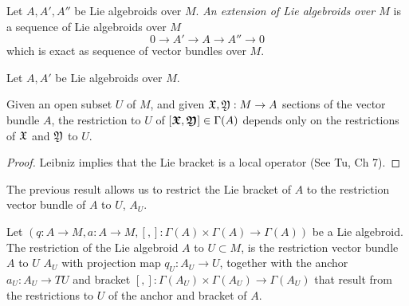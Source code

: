 \begin{definition} 
Let $A, A', A''$ be Lie algebroids over $M$. \emph{An extension of Lie algebroids over $M$} is a sequence of Lie algebroids over $M$ \[ 0 \to A' \to A \to A'' \to 0 \] which is exact as sequence of vector bundles over $M$.
\end{definition}

\linea

\begin{definition}
Let $A, A'$ be Lie algebroids over $M$. 
\end{definition}

\begin{proposition}
Given an open subset $U$ of $M$, and given $\mathfrak{X}, \mathfrak{Y} : M \to A$ sections of the vector bundle $A$, the restriction to $U$ of $[\bm{\mathfrak{X}}, \bm{\mathfrak{Y}}] \in \Gamma(A)$ depends only on the restrictions of $\mathfrak{X}$ and $\mathfrak{Y}$ to $U$.
\end{proposition}
\begin{proof}
Leibniz implies that the Lie bracket is a local operator (See Tu, Ch 7).
\end{proof}

The previous result allows us to restrict the Lie bracket of $A$ to the restriction vector bundle of $A$ to $U$, $A_U$.

\begin{definition}
Let $(q:A \to M, a: A \to M, [,]:\Gamma(A)\times \Gamma(A) \to \Gamma(A))$ be a Lie algebroid. The restriction of the Lie algebroid $A$ to $U \subset M$, is the restriction vector bundle $A$ to $U$ $A_U$ with projection map $q_U: A_U \to U$, together with the anchor $a_U:A_U \to TU$ and bracket $[,]:\Gamma(A_U)\times \Gamma(A_U) \to \Gamma(A_U)$ that result from the restrictions to $U$ of the anchor and bracket of $A$.
\end{definition}

\begin{definition}

\end{definition}

\begin{definition}

\end{definition}

\begin{definition}[Pullbacks]

\end{definition}

